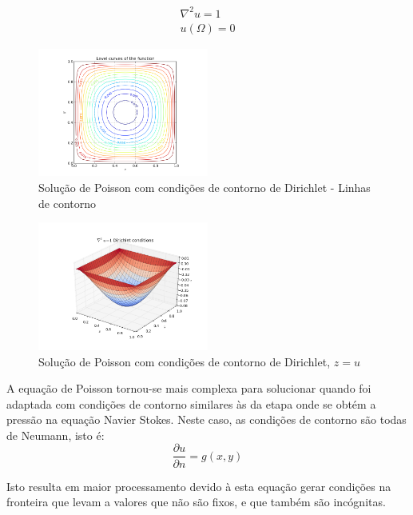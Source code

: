 \documentclass[journal]{IEEEtran}
\begin{document}
\begin{eqnarray}
\nabla^2 u = 1\label{poisson_resolvida}\\
u(\Omega)=0 \nonumber
\end{eqnarray}

\begin{figure}[ht!]
\centering
\includegraphics[width = 0.5\textwidth]{figures/poisson_dirichlet_solved_level.png}
\caption{Solução de Poisson com condições de contorno de Dirichlet - Linhas de contorno\label{poisson_dirichlet_contorno}}
\end{figure}

\begin{figure}[ht!]
\centering
\includegraphics[width = 0.5\textwidth]{figures/poisson_dirichlet_solved.png}
\caption{Solução de Poisson com condições de contorno de Dirichlet, $z=u$\label{poisson_dirichlet_solved}}
\end{figure}

A equação de Poisson tornou-se mais complexa para solucionar quando foi adaptada com condições de contorno similares às da etapa onde se obtém a pressão na equação Navier Stokes. Neste caso, as condições de contorno são todas de Neumann, isto é:
\begin{equation}
\frac{\partial u}{\partial n} = g(x,y)
\end{equation}


Isto resulta em maior processamento devido à esta equação gerar condições na fronteira que levam a valores que não são fixos, e que também são incógnitas.
\end{document}
